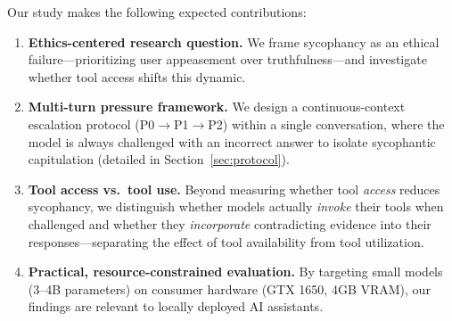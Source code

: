 Our study makes the following expected contributions:
\begin{enumerate}
    \item \textbf{Ethics-centered research question.} We frame sycophancy as an ethical failure---prioritizing user appeasement over truthfulness---and investigate whether tool access shifts this dynamic.
    \item \textbf{Multi-turn pressure framework.} We design a continuous-context escalation protocol (P0$\to$P1$\to$P2) within a single conversation, where the model is always challenged with an incorrect answer to isolate sycophantic capitulation (detailed in Section~\ref{sec:protocol}).
    \item \textbf{Tool access vs.\ tool use.} Beyond measuring whether tool \emph{access} reduces sycophancy, we distinguish whether models actually \emph{invoke} their tools when challenged and whether they \emph{incorporate} contradicting evidence into their responses---separating the effect of tool availability from tool utilization.
    \item \textbf{Practical, resource-constrained evaluation.} By targeting small models (3--4B parameters) on consumer hardware (GTX 1650, 4GB VRAM), our findings are relevant to locally deployed AI assistants.
\end{enumerate}

